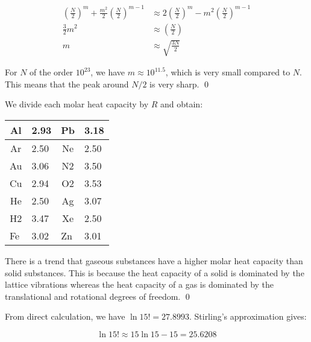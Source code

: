\documentclass[12pt]{article}
\begin{document}
\begin{equation}
    \begin{split}
        \left( \frac{N}{2} \right)^{m} + \frac{m^{2}}{2} \left( \frac{N}{2} \right)^{m - 1} &\approx 2 \left( \frac{N}{2} \right)^{m} - m^{2} \left( \frac{N}{2} \right)^{m - 1} \\
        \frac{3}{2} m^{2} &\approx \left( \frac{N}{2} \right) \\
        m &\approx \sqrt{\frac{3N}{2}}
    \end{split}
\end{equation}

For $N$ of the order $10^{23}$, we have $m \approx 10^{11.5}$, which is very small compared to $N$. This means that the peak around $N/2$ is very sharp.
\qed


We divide each molar heat capacity by $R$ and obtain:

\begin{table}[h!]
    \centering
    \begin{tabular}{|c|l|c|l|}
        \hline
        Al                       & 2.93 & Pb                      & 3.18 \\ \hline
        Ar                       & 2.50 & Ne                      & 2.50 \\ \hline
        Au                       & 3.06 & N2                      & 3.50 \\ \hline
        Cu                       & 2.94 & O2                      & 3.53 \\ \hline
        He                       & 2.50 & Ag                      & 3.07 \\ \hline
        H2                       & 3.47 & Xe                      & 2.50 \\ \hline
        \multicolumn{1}{|l|}{Fe} & 3.02 & \multicolumn{1}{l|}{Zn} & 3.01 \\ \hline
    \end{tabular}
\end{table}

There is a trend that gaseous substances have a higher molar heat capacity than solid substances. This is because the heat capacity of a solid is dominated by the lattice vibrations whereas the heat capacity of a gas is dominated by the translational and rotational degrees of freedom.
\qed


From direct calculation, we have $\ln{15!} = 27.8993$. Stirling's approximation gives:

\begin{equation}
    \ln{15!} \approx 15\ln{15} - 15 = 25.6208
\end{equation}
\end{document}
